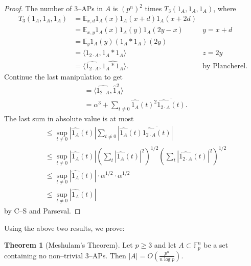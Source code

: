 \documentclass{article}
\theoremstyle{definition}
\newtheorem{theorem}{Theorem}[section]
\begin{document}
\begin{proof}
    The number of 3--APs in $A$ is $(p^n)^2$ times $T_3(1_A,1_A,1_A)$, where
    \begin{align*}
        T_3(1_A,1_A,1_A) &= \mathbb{E}_{x,d}1_A(x)1_A(x+d)1_A(x+2d) \\
        &= \mathbb{E}_{x,y}1_A(x)1_A(y)1_A(2y-x) &y=x+d\\
        &= \mathbb{E}_{y}1_A(y) (1_A * 1_A)(2y) \\
        &= \langle 1_{2\cdot A}, 1_A * 1_A \rangle &z=2y\\
        &= \langle \widehat{1_{2\cdot A}}, \widehat{1_A * 1_A}\rangle. &\text{by Plancherel}.
    \end{align*}
    Continue the last manipulation to get 
    \begin{align*}
        &= \langle \widehat{1_{2\cdot A}}, \hat{1}_A^2 \rangle \\
        &= \alpha^3 + \sum_{t \neq 0}^{} \widehat{1_A}(t)^2 \overline{\widehat{1_{2\cdot A}}(t)}.
    \end{align*}
    The last sum in absolute value is at most 
    \begin{align*}
        &\le \sup_{t \neq 0}|\widehat{1_A}(t)|\sum_{t\neq0}^{} |\widehat{1_A}(t)\overline{\widehat{1_{2\cdot A}}(t)}| \\
        &\le \sup_{t\neq 0}|\widehat{1_A}(t)| \left(\sum_{t}^{} |\widehat{1_A}(t)|^2\right)^{1/2}\left(\sum_{t}^{} |\widehat{1_{2\cdot A}}(t)|^2\right)^{1/2}\\
        &\le \sup_{t \neq 0}|\widehat{1_A}(t)|\cdot \alpha^{1/2} \cdot \alpha^{1/2} \\
        &\le \sup_{t \neq 0}|\widehat{1_A}(t)|
    \end{align*}
    by C--S and Parseval.
\end{proof}
Using the above two results, we prove:
\begin{theorem}[Meshulam's Theorem]\label{theorem1.17}
    Let $p\ge 3$ and let $A \subset \mathbb{F}_p^n$ be a set containing no non--trivial 3--APs. Then $|A| = O\left(\frac{p^n}{n \log p}\right)$. 
\end{theorem}
\end{document}

